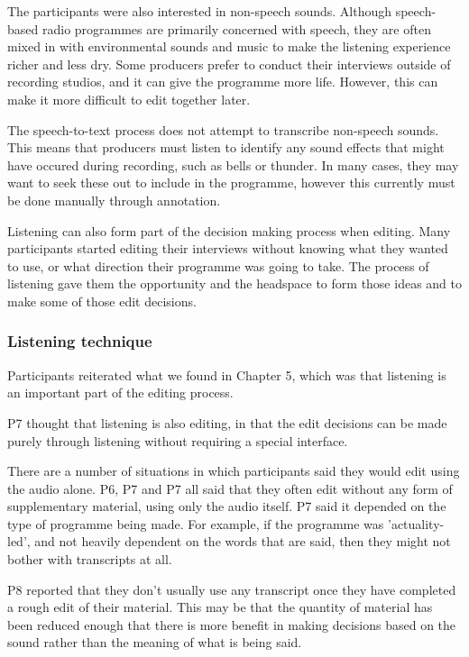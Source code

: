 
The participants were also interested in non-speech sounds. Although speech-based radio programmes are primarily
concerned with speech, they are often mixed in with environmental sounds and music to make the listening experience
richer and less dry. Some producers prefer to conduct their interviews outside of recording studios, and it can give
the programme more life. However, this can make it more difficult to edit together later.

The speech-to-text process does not attempt to transcribe non-speech sounds. This means that producers must listen to
identify any sound effects that might have occured during recording, such as bells or thunder. In many cases, they may
want to seek these out to include in the programme, however this currently must be done manually through annotation.


Listening can also form part of the decision making process when editing. Many participants started editing their
interviews without knowing what they wanted to use, or what direction their programme was going to take. The process of
listening gave them the opportunity and the headspace to form those ideas and to make some of those edit decisions.

\subsubsection{Listening technique}

Participants reiterated what we found in Chapter 5, which was that listening is an important part of the editing
process.

P7 thought that listening is also editing, in that the edit decisions can be made purely through listening without
requiring a special interface.


There are a number of situations in which participants said they would edit using the audio alone. P6, P7 and P7 all
said that they often edit without any form of supplementary material, using only the audio itself. P7 said it depended
on the type of programme being made. For example, if the programme was 'actuality-led', and not heavily dependent on
the words that are said, then they might not bother with transcripts at all.

P8 reported that they don't usually use any transcript once they have completed a rough edit of their material. This
may be that the quantity of material has been reduced enough that there is more benefit in making decisions based on
the sound rather than the meaning of what is being said.

